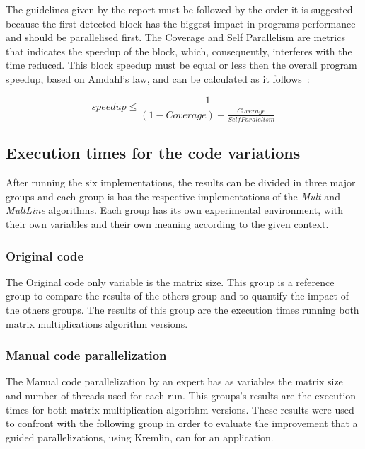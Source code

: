 The guidelines given by the report must be followed by the order it is suggested because the first detected block has the biggest impact in programs performance and should be parallelised first. The Coverage and Self Parallelism are metrics that indicates the speedup of the block, which, consequently, interferes with the time reduced. This block speedup must be equal or less then the overall program speedup, based on Amdahl's law, and can be calculated as it follows~\cite{Saturnino}:

\begin{equation}
speedup \leq \frac{1}{(1- Coverage) - \frac{Coverage}{Self Paralelism}}
\end{equation}

\subsection{Execution times for the code variations}

After running the six implementations, the results can be divided in three major groups and each group is has the respective implementations of the \textit{Mult} and \textit{MultLine} algorithms. Each group has its own experimental environment,  with their own variables and their own meaning according to the given context.

\subsubsection{Original code}

The Original code only variable is the matrix size. This group is  a reference group to compare the results of the others group and to quantify the impact of the others groups. The results of this group are the execution times running both matrix multiplications algorithm versions.

\subsubsection{Manual code parallelization}

The Manual code parallelization by an expert has as variables the matrix size and number of threads used for each run. This groups's results are the execution times for both matrix multiplication algorithm versions. These results were used to confront with the following group in order to evaluate the improvement that a guided parallelizations, using Kremlin, can for an application.

